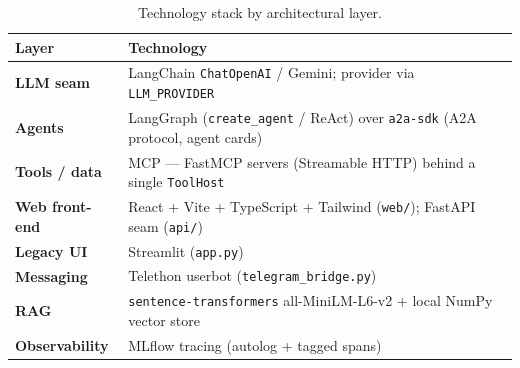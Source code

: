 \documentclass[11pt,a4paper]{article}
\newcommand{\code}[1]{{\small\texttt{#1}}}
\begin{document}
\begin{table}[ht]\centering\footnotesize
\renewcommand{\arraystretch}{1.25}
\begin{tabular}{@{}>{\bfseries}l l@{}}
\toprule
\normalfont\textbf{Layer} & \textbf{Technology} \\
\midrule
LLM seam        & LangChain \code{ChatOpenAI} / Gemini; provider via \code{LLM\_PROVIDER} \\
Agents          & LangGraph (\code{create\_agent} / ReAct) over \code{a2a-sdk} (A2A protocol, agent cards) \\
Tools / data    & MCP --- FastMCP servers (Streamable HTTP) behind a single \code{ToolHost} \\
Web front-end   & React + Vite + TypeScript + Tailwind (\code{web/}); FastAPI seam (\code{api/}) \\
Legacy UI       & Streamlit (\code{app.py}) \\
Messaging       & Telethon userbot (\code{telegram\_bridge.py}) \\
RAG             & \code{sentence-transformers} all-MiniLM-L6-v2 + local NumPy vector store \\
Observability   & MLflow tracing (autolog + tagged spans) \\
\bottomrule
\end{tabular}
\caption{Technology stack by architectural layer.}
\end{table}
\end{document}

